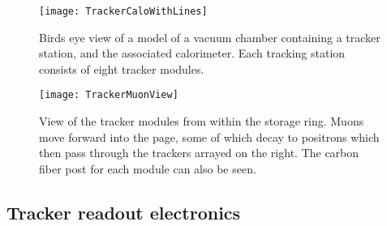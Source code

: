 

\begin{figure}
    \centering
    \texttt{[image: TrackerCaloWithLines]}
    \caption[Model view of tracker station]{Birds eye view of a model of a vacuum chamber containing a tracker station, and the associated calorimeter. Each tracking station consists of eight tracker modules.}
    \label{fig:TrackerCaloWithLines}
\end{figure}

\begin{figure}
    \centering
    \texttt{[image: TrackerMuonView]}
    \caption[Muon perspective view of tracker station]{View of the tracker modules from within the storage ring. Muons move forward into the page, some of which decay to positrons which then pass through the trackers arrayed on the right. The carbon fiber post for each module can also be seen.}
    \label{fig:TrackerMuonView}
\end{figure}





\subsection{Tracker readout electronics}


